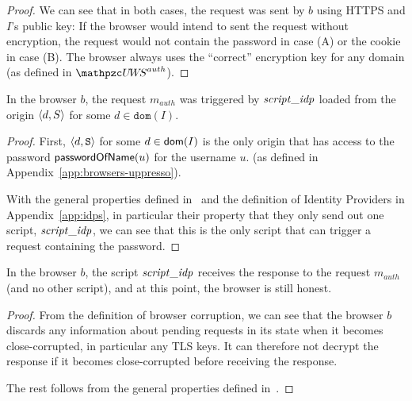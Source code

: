 \begin{proof}
    We can see that in both cases, the request was sent by $b$ 
    using HTTPS and $I$'s public key: If the browser would 
    intend to sent the request without encryption, the request 
    would not contain the password in case (A) or the cookie in 
    case (B). The browser always uses the ``correct'' encryption 
    key for any domain (as defined in $\uppressoauthwebsystem$).
  \end{proof}
  
  \begin{lemma} %
    In the browser $b$, the request $m_{auth}$ was triggered by $\mathit{script\_idp}$ 
    loaded from the origin $\langle {{}d, S} \rangle$ for some $d \in \mathtt{dom}(I)$.
  \end{lemma}
  \begin{proof}
    First, $\langle d,\mathtt{S}\rangle$ for some $d \in \mathsf{dom}(I)$ is the 
    only origin that has access to the password $\mathsf{passwordOfName}(u)$ for 
    the username $u$.
    (as defined in Appendix~\ref{app:browsers-uppresso}).
  
    With the general properties defined in~\cite{BrowserID} and the
    definition of Identity Providers in Appendix~\ref{app:idps}, in
    particular their property that they only send out one script,
    $\mathit{script\_idp}$, we can see that this is the only script that can
    trigger a request containing the password.
  \end{proof}
  
  \begin{lemma} \label{lemma:idp-to-script-idp} %
    In the browser $b$, the script $\mathit{script\_idp}$ receives 
    the response to the request $m_{auth}$ (and no other script), 
    and at this point, the browser is still honest.
  \end{lemma}
  \begin{proof}
    From the definition of browser corruption, we can see that 
    the browser $b$ discards any information about pending 
    requests in its state when it becomes close-corrupted, in 
    particular any TLS keys. It can therefore not decrypt the 
    response if it becomes close-corrupted before receiving the 
    response.
  
    The rest follows from the general properties defined
    in~\cite{BrowserID}.
  \end{proof}
  
